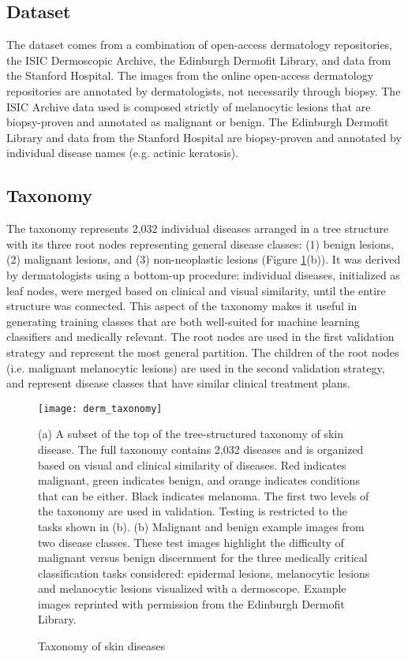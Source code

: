 \subsection{Dataset}
The dataset comes from a combination of open-access dermatology repositories, the ISIC Dermoscopic Archive, the Edinburgh Dermofit Library, and data from the Stanford Hospital. The images from the online open-access dermatology repositories are annotated by dermatologists, not necessarily through biopsy. The ISIC Archive data used is composed strictly of melanocytic lesions that are biopsy-proven and annotated as malignant or benign. The Edinburgh Dermofit Library and data from the Stanford Hospital are biopsy-proven and annotated by individual disease names (e.g. actinic keratosis). 

\subsection{Taxonomy}
The taxonomy represents 2,032 individual diseases arranged in a tree structure with its three root nodes representing general disease classes: (1) benign lesions, (2) malignant lesions, and (3) non-neoplastic lesions (Figure \ref{fig:derm_taxonomy}(b)). It was derived by dermatologists using a bottom-up procedure: individual diseases, initialized as leaf nodes, were merged based on clinical and visual similarity, until the entire structure was connected. This aspect of the taxonomy makes it useful in generating training classes that are both well-suited for machine learning classifiers and medically relevant. The root nodes are used in the first validation strategy and represent the most general partition. The children of the root nodes (i.e. malignant melanocytic lesions) are used in the second validation strategy, and represent disease classes that have similar clinical treatment plans.

\begin{figure}
\texttt{[image: derm\_taxonomy]}
\caption{Taxonomy of skin diseases}
\vspace{12px}
(a) A subset of the top of the tree-structured taxonomy of skin disease. The full taxonomy contains 2,032 diseases and is organized based on visual and clinical similarity of diseases. Red indicates malignant, green indicates benign, and orange indicates conditions that can be either. Black indicates melanoma. The first two levels of the taxonomy are used in validation. Testing is restricted to the tasks shown in (b). (b) Malignant and benign example images from two disease classes. These test images highlight the difficulty of malignant versus benign discernment for the three medically critical classification tasks considered: epidermal lesions, melanocytic lesions and melanocytic lesions visualized with a dermoscope. Example images reprinted with permission from the Edinburgh Dermofit Library.
\label{fig:derm_taxonomy}
\end{figure}


